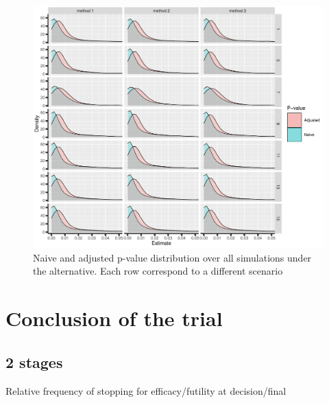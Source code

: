 \documentclass[12pt]{article}
\begin{document}
\begin{figure}[!h]
\centering
\includegraphics[trim={0 0 0 0},width=1\textwidth]{./figures/gg-pvalue2-density.pdf}
\caption{Naive and adjusted p-value distribution over all simulations under the alternative. Each row correspond to a different scenario}
\end{figure}

\clearpage

\section{Conclusion of the trial}
\label{sec:orga165221}

\subsection{2 stages}
\label{sec:org771dea9}
Relative frequency of stopping for efficacy/futility at decision/final
\end{document}

